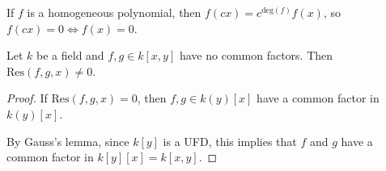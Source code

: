 \documentclass[a4paper,twoside,master.tex]{subfiles}
\begin{document}
If $ f $ is a homogeneous polynomial, then $ f(cx) = c^{\text{deg}(f)} f(x) $, so $ f(cx) = 0 \iff f(x) = 0 $. 

\begin{lemma}
    Let $ k $ be a field and $ f,g \in k[x,y] $ have no common factors. Then $ \text{Res}(f,g,x) \neq 0 $.
\end{lemma}
\begin{proof}
    If $ \text{Res}(f,g,x) = 0 $, then $ f,g \in k(y)[x] $ have a common factor in $ k(y)[x] $.

    By Gauss's lemma, since $ k[y] $ is a UFD, this implies that $ f $ and $ g $ have a common factor in $ k[y][x] = k[x,y] $.
\end{proof}
\end{document}
